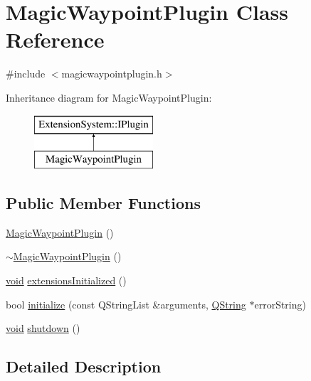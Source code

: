 \hypertarget{class_magic_waypoint_plugin}{\section{\-Magic\-Waypoint\-Plugin \-Class \-Reference}
\label{class_magic_waypoint_plugin}
}


{\ttfamily \#include $<$magicwaypointplugin.\-h$>$}

\-Inheritance diagram for \-Magic\-Waypoint\-Plugin\-:\begin{figure}[H]
\begin{center}
\leavevmode
\includegraphics[height=2.000000cm]{class_magic_waypoint_plugin}
\end{center}
\end{figure}
\subsection*{\-Public \-Member \-Functions}
\begin{DoxyCompactItemize}
\item 
\hyperlink{group___g_c_s_control_gadget_plugin_ga89fc30c92d7ea9574134d87f7378a2b6}{\-Magic\-Waypoint\-Plugin} ()
\item 
\hyperlink{group___g_c_s_control_gadget_plugin_ga4f66f5fe1f496bc719c7ca504b944579}{$\sim$\-Magic\-Waypoint\-Plugin} ()
\item 
\hyperlink{group___u_a_v_objects_plugin_ga444cf2ff3f0ecbe028adce838d373f5c}{void} \hyperlink{group___g_c_s_control_gadget_plugin_gaf45230b46b95ad6f1a8f74dc1023b94a}{extensions\-Initialized} ()
\item 
bool \hyperlink{group___g_c_s_control_gadget_plugin_ga2c2d28520438e765c6e3ba288777e894}{initialize} (const \-Q\-String\-List \&arguments, \hyperlink{group___u_a_v_objects_plugin_gab9d252f49c333c94a72f97ce3105a32d}{\-Q\-String} $\ast$error\-String)
\item 
\hyperlink{group___u_a_v_objects_plugin_ga444cf2ff3f0ecbe028adce838d373f5c}{void} \hyperlink{group___g_c_s_control_gadget_plugin_gaa9be91fd32c41e37bfdbd77c2420373f}{shutdown} ()
\end{DoxyCompactItemize}


\subsection{\-Detailed \-Description}


